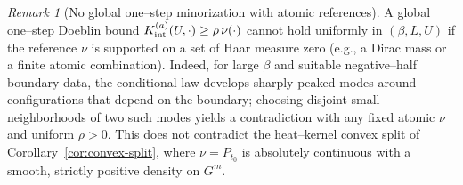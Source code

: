\documentclass[11pt]{amsart}
\theoremstyle{plain}
\theoremstyle{definition}
\theoremstyle{remark}
\newtheorem{remark}[theorem]{Remark}
\begin{document}
\begin{remark}[No global one--step minorization with atomic references]\label{rem:no-global-minorization-atomic}
A global one--step Doeblin bound $K_{\rm int}^{(a)}(U,\cdot)\ge \rho\,\nu(\cdot)$ cannot hold uniformly in $(\beta,L,U)$ if the reference $\nu$ is supported on a set of Haar measure zero (e.g., a Dirac mass or a finite atomic combination). Indeed, for large $\beta$ and suitable negative--half boundary data, the conditional law develops sharply peaked modes around configurations that depend on the boundary; choosing disjoint small neighborhoods of two such modes yields a contradiction with any fixed atomic $\nu$ and uniform $\rho>0$. This does not contradict the heat--kernel convex split of Corollary~\ref{cor:convex-split}, where $\nu=P_{t_0}$ is absolutely continuous with a smooth, strictly positive density on $G^m$.
\end{remark}
\end{document}

